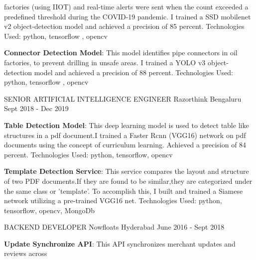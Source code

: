 \begin{cventries}
{\begin{cvitems}
{      factories (using IIOT) and real-time alerts were sent when the count exceeded a predefined threshold during the 
      COVID-19 pandemic. I trained a SSD mobilenet v2 object-detection model and achieved a precision of 85 percent. 
      Technologies Used: python, tensorflow , opencv }
      \item{\textbf{Connector Detection Model}: This model identifies pipe connectors 
      in oil factories, to prevent drilling in unsafe areas. I trained a 
      YOLO v3 object-detection model and achieved a precision of 88 percent. 
      Technologies Used: python, tensorflow , opencv}
	\end{cvitems}
    }
\vspace{2em} %
  \cventry
    {SENIOR ARTIFICIAL INTELLIGENCE ENGINEER} %
    {Razorthink} %
    {Bengaluru} %
    {Sept 2018 - Dec 2019} %
    {
      \begin{cvitems} %
        \item{\textbf{Table Detection Model}: This deep learning model is used to 
        detect table like structures in a pdf document.I trained a Faster Rcnn (VGG16) 
        network on pdf documents using the concept of curriculum learning. Achieved a 
        precision of 84 percent. 
        Technologies Used: python, tensorflow, opencv}        
        \item{\textbf{Template Detection Service}: This service compares the layout and 
        structure of two PDF documents.If they are found to be similar,they 
        are categorized under the same class or ’template’. To accomplish this, 
        I built and trained a Siamese network utilizing a pre-trained VGG16 net. 
        Technologies Used: python, tensorflow, opencv, MongoDb}        
	\end{cvitems}
    }
\vspace{2em} %
  \cventry
    {BACKEND DEVELOPER} %
    {Nowfloats} %
    {Hyderabad} %
    {June 2016 - Sept 2018} %
    {
      \begin{cvitems} %
        \item {\textbf{Update Synchronize API}: This API synchronizes merchant updates and reviews across 
}
\end{cvitems}}
\end{cventries}
